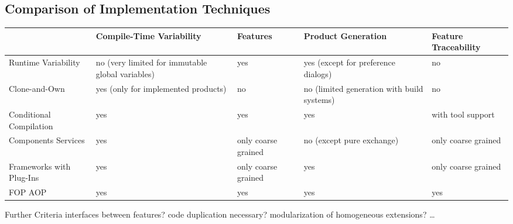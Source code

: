 \subsection{Comparison of Implementation Techniques}
\begin{frame}{\myframetitle}
	\centering
	\begin{tabular}{|p{32mm}|p{32mm}|p{14mm}|p{27mm}|p{14mm}|}
		\hline
		 & Compile-Time Variability & Features & Product \mbox{Generation} & Feature \mbox{Traceability} \\
		\hline\pause
		Runtime \mbox{Variability} & no (very limited for immutable global variables) & yes & yes (except for preference dialogs) & no \\
		\hline\pause
		Clone-and-Own & yes (only for implemented products) & no & no (limited generation with build systems) & no \\
		\hline\pause
		Conditional Compilation & yes & yes & yes & with tool support \\
		\hline\pause
		Components \linebreak Services & yes & only coarse grained & no (except pure exchange) & only coarse grained \\
		\hline\pause
		Frameworks with Plug-Ins & yes & only coarse grained & yes & only coarse grained \\
		\hline\pause
		FOP \linebreak AOP & yes & yes & yes & yes \\
		\hline
	\end{tabular}
	\pause
	\begin{note}{Further Criteria}
		interfaces between features? code duplication necessary? modularization of homogeneous extensions? \ldots
	\end{note}
\end{frame}


